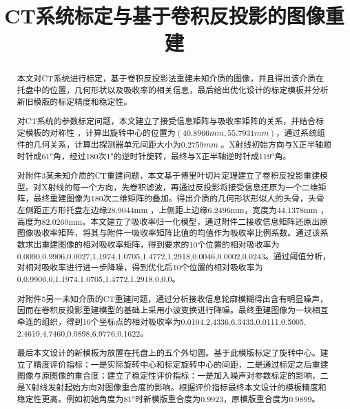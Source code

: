 \documentclass[withoutpreface,bwprint]{cumcmthesis} %
\title{CT系统标定与基于卷积反投影的图像重建}
\begin{document}
 \maketitle

\begin{abstract}

\par 本文对CT系统进行标定，基于卷积反投影法重建未知介质的图像，并且得出该介质在托盘中的位置，几何形状以及吸收率的相关信息，最后给出优化设计的标定模板并分析新旧模版的标定精度和稳定性。

\par 对CT系统的参数标定问题，本文建立了接受信息矩阵与吸收率矩阵的关系，并结合标定模板的对称性 ，计算出旋转中心的位置为$(40.8966mm,55.7931mm)$，通过系统组件的几何关系，计算出探测器单元间距大小为$0.2759mm$ 。X射线初始方向与X正半轴顺时针成$61^o$角，经过180次1°的逆时针旋转，最终与X正半轴逆时针成$119^o$角。

\par 对附件3某未知介质的CT重建问题，本文基于傅里叶切片定理建立了卷积反投影重建模型。对X射线的每一个方向，先卷积滤波，再通过反投影将接受信息还原为一个二维矩阵，最终重建图像为180次二维矩阵的叠加。得出介质的几何形状形似人的头骨，头骨左侧距正方形托盘左边缘28.9044mm ，上侧距上边缘6.2496mm，宽度为44.1378mm ，高度为82.0260mm。本文建立了吸收率归一化模型，通过附件二接收信息矩阵还原出原图像吸收率矩阵，将其与附件一吸收率矩阵比值的均值作为吸收率比例系数。通过该系数求出重建图像的相对吸收率矩阵，得到要求的10个位置的相对吸收率为0.0090,0.9906,0.0027,1.1974,1.0705,1.4772,1.2918,0.0046,0.0002,0.0243。通过阈值分析，对相对吸收率进行进一步降噪，得到优化后10个位置的相对吸收率为0,0.9906,0,1.1974,1.0705,1.4772,1.2918,0,0,0。

\par 对附件5另一未知介质的CT重建问题，通过分析接收信息轮廓模糊得出含有明显噪声，因而在卷积反投影重建模型的基础上采用小波变换进行降噪。最终重建图像为一块相互牵连的组织，得到10个坐标点的相对吸收率为0.0104,2.4336,6.3433,0.0111,0.5005,
2.4619,4.7460,0.0898,6.9776,0.1622。

\par 最后本文设计的新模板为放置在托盘上的五个外切圆。基于此模版标定了旋转中心。建立了精度评价指标：一是实际旋转中心和标定旋转中心的间距，二是通过标定之后重建图像与原图像的重合度；建立了稳定性评价指标：一是加入噪声对参数标定的影响，二是X射线发射起始方向对图像重合度的影响。根据评价指标最终本文设计的模板精度和稳定性更高。例如初始角度为$81^o$时新模版重合度为$0.9923$，原模版重合度为$0.9899$。
 

\end{abstract}
\end{document}
